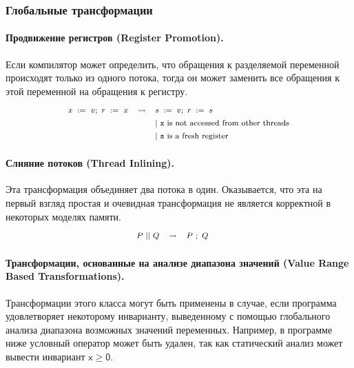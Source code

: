 \subsubsection{Глобальные трансформации}

\paragraph{
Продвижение регистров
(Register Promotion).
}

Если компилятор может определить, что 
обращения к разделяемой переменной 
происходят только из одного потока,
тогда он может заменить все обращения к этой переменной 
на обращения к регистру.
%
\[\def\arraystretch{1.4}\footnotesize
  \begin{array}{ccl} 

      \writeInst{}{x}{v} \seq \readInst{}{r}{x} 
    & \leadsto 
    & \assignInst{s}{v} \seq \assignInst{r}{s}
    \\ 
    
    & & |~ \text{\texttt{x} is not accessed from other threads} \\
    & & |~ \text{\texttt{s} is a fresh register} \\ 

  \end{array}
\]

\paragraph{Слияние потоков (Thread Inlining).}

Эта трансформация объединяет два потока в один.
Оказывается, что эта на первый взгляд простая и очевидная
трансформация не является корректной в некоторых моделях памяти. 
%
\[\def\arraystretch{1.4}\footnotesize
  \begin{array}{cccl} 

      P \pll Q 
    & \leadsto 
    & P ~\seq Q
    & ~ \\ 
    
  \end{array}
\]


\paragraph{
Трансформации, основанные на анализе диапазона значений
(Value Range Based Transformations).
}

Трансформации этого класса могут быть применены в случае,
если программа удовлетворяет некоторому инварианту,
выведенному с помощью глобального анализа 
диапазона возможных значений переменных.
Например, в программе ниже условный оператор
может быть удален, так как статический 
анализ может вывести инвариант 
$\mathsf{x} \geq \mathsf{0}$.

